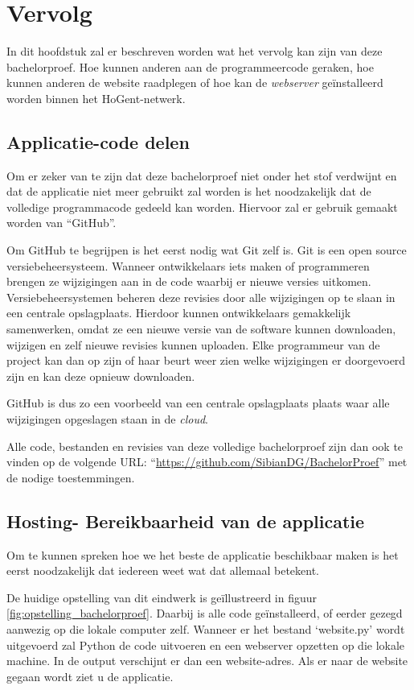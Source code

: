 \chapter{Vervolg}
\label{ch:vervolg}

In dit hoofdstuk zal er beschreven worden wat het vervolg kan zijn van deze bachelorproef. Hoe kunnen anderen aan de programmeercode geraken, hoe kunnen anderen de website raadplegen of hoe kan de \textit{webserver} geïnstalleerd worden binnen het HoGent-netwerk.

\section{Applicatie-code delen}
Om er zeker van te zijn dat deze bachelorproef niet onder het stof verdwijnt en dat de applicatie niet meer gebruikt zal worden is het noodzakelijk dat de volledige programmacode gedeeld kan worden. Hiervoor zal er gebruik gemaakt worden van ``GitHub''.

Om GitHub te begrijpen is het eerst nodig wat Git zelf is. Git is een open source versiebeheersysteem. Wanneer ontwikkelaars iets maken of programmeren brengen ze wijzigingen aan in de code waarbij er nieuwe versies uitkomen. Versiebeheersystemen beheren deze revisies door alle wijzigingen op te slaan in een centrale opslagplaats. Hierdoor kunnen ontwikkelaars gemakkelijk samenwerken, omdat ze een nieuwe versie van de software kunnen downloaden, wijzigen en zelf nieuwe revisies kunnen uploaden. Elke programmeur van de project kan dan op zijn of haar beurt weer zien welke wijzigingen er doorgevoerd zijn en kan deze opnieuw downloaden.~\autocite{Brown2019}

GitHub is dus zo een voorbeeld van een centrale opslagplaats plaats waar alle wijzigingen opgeslagen staan in de \textit{cloud}.

Alle code, bestanden en revisies van deze volledige bachelorproef zijn dan ook te vinden op de volgende URL: ``\url{https://github.com/SibianDG/BachelorProef}'' met de nodige toestemmingen.

\section{Hosting- Bereikbaarheid van de applicatie}
Om te kunnen spreken hoe we het beste de applicatie beschikbaar maken is het eerst noodzakelijk dat iedereen weet wat dat allemaal betekent.

De huidige opstelling van dit eindwerk is geïllustreerd in figuur \ref{fig:opstelling_bachelorproef}. Daarbij is alle code geïnstalleerd, of eerder gezegd aanwezig op die lokale computer zelf. Wanneer er het bestand `website.py' wordt uitgevoerd zal Python de code uitvoeren en een webserver opzetten op die lokale machine. In de output verschijnt er dan een website-adres. Als er naar de website gegaan wordt ziet u de applicatie.


